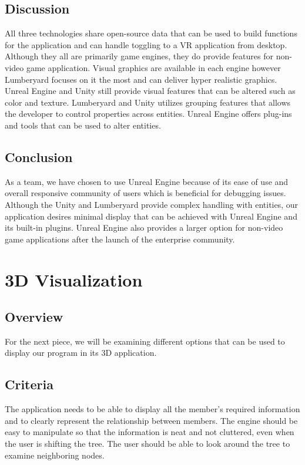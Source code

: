 \documentclass[onecolumn, draftclsnofoot, 10pt, compsoc]{IEEEtran}
\begin{document}
\subsection{Discussion}
\begin{singlespace}
All three technologies share open-source data that can be used to build functions for the application and can handle toggling to a VR application from desktop. Although they all are primarily game engines, they do provide features for non-video game application. Visual graphics are available in each engine however Lumberyard focuses on it the most and can deliver hyper realistic graphics. Unreal Engine and Unity still provide visual features that can be altered such as color and texture. Lumberyard and Unity utilizes grouping features that allows the developer to control properties across entities. Unreal Engine offers plug-ins and tools that can be used to alter entities.
\end{singlespace}

\subsection{Conclusion}
\begin{singlespace}
As a team, we have chosen to use Unreal Engine because of its ease of use and overall responsive community of users which is beneficial for debugging issues. Although the Unity and Lumberyard provide complex handling with entities, our application desires minimal display that can be achieved with Unreal Engine and its built-in plugins. Unreal Engine also provides a larger option for non-video game applications after the launch of the enterprise community.   
\end{singlespace}

\section{3D Visualization}
\subsection{Overview}
\begin{singlespace}
For the next piece, we will be examining different options that can be used to display our program in its 3D application. 
\end{singlespace}

\subsection{Criteria}
\begin{singlespace}
The application needs to be able to display all the member’s required information and to clearly represent the relationship between members. The engine should be easy to manipulate so that the information is neat and not cluttered, even when the user is shifting the tree. The user should be able to look around the tree to examine neighboring nodes.  
\end{singlespace}
\end{document}
